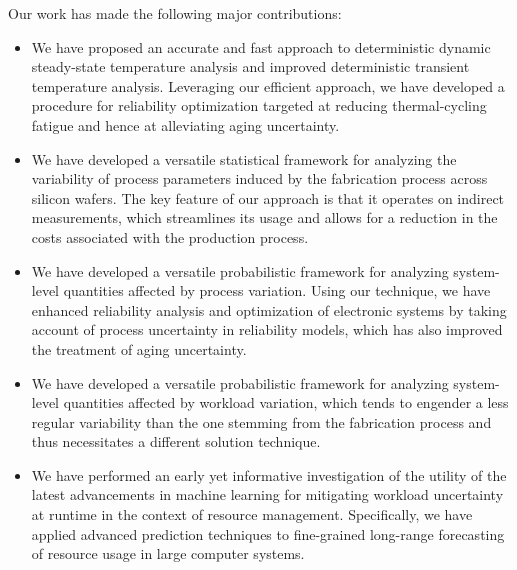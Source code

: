 Our work has made the following major contributions:

\begin{itemize}

\item
We have proposed an accurate and fast approach to deterministic dynamic
steady-state temperature analysis and improved deterministic transient
temperature analysis. Leveraging our efficient approach, we have developed a
procedure for reliability optimization targeted at reducing thermal-cycling
fatigue and hence at alleviating aging uncertainty.

\item
We have developed a versatile statistical framework for analyzing the
variability of process parameters induced by the fabrication process across
silicon wafers. The key feature of our approach is that it operates on indirect
measurements, which streamlines its usage and allows for a reduction in the
costs associated with the production process.

\item
We have developed a versatile probabilistic framework for analyzing system-level
quantities affected by process variation. Using our technique, we have enhanced
reliability analysis and optimization of electronic systems by taking account of
process uncertainty in reliability models, which has also improved the treatment
of aging uncertainty.

\item
We have developed a versatile probabilistic framework for analyzing system-level
quantities affected by workload variation, which tends to engender a less
regular variability than the one stemming from the fabrication process and thus
necessitates a different solution technique.

\item
We have performed an early yet informative investigation of the utility of the
latest advancements in machine learning for mitigating workload uncertainty at
runtime in the context of resource management. Specifically, we have applied
advanced prediction techniques to fine-grained long-range forecasting of
resource usage in large computer systems.

\end{itemize}

